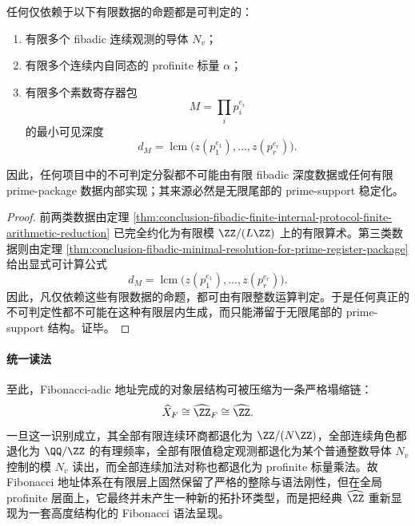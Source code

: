 \begin{corollary}\label{cor:conclusion-fibadic-undecidability-not-from-finite-depth-or-finite-package}
任何仅依赖于以下有限数据的命题都是可判定的：
\begin{enumerate}
\normalfont
  \item 有限多个 fibadic 连续观测的导体 \(N_v\)；
  \item 有限多个连续内自同态的 profinite 标量 \(\alpha\)；
  \item 有限多个素数寄存器包
  \[
  M=\prod_i p_i^{e_i}
  \]
  的最小可见深度
  \[
  d_M=\operatorname{lcm}\bigl(z(p_1^{e_1}),\dots,z(p_r^{e_r})\bigr).
  \]
\end{enumerate}
因此，任何项目中的不可判定分裂都不可能由有限 fibadic 深度数据或任何有限 prime-package 数据内部实现；其来源必然是无限尾部的 prime-support 稳定化。
\end{corollary}
\begin{proof}
前两类数据由定理 \ref{thm:conclusion-fibadic-finite-internal-protocol-finite-arithmetic-reduction} 已完全约化为有限模 \(\ZZ/(L\ZZ)\) 上的有限算术。第三类数据则由定理 \ref{thm:conclusion-fibadic-minimal-resolution-for-prime-register-package} 给出显式可计算公式
\[
d_M=\operatorname{lcm}\bigl(z(p_1^{e_1}),\dots,z(p_r^{e_r})\bigr).
\]
因此，凡仅依赖这些有限数据的命题，都可由有限整数运算判定。于是任何真正的不可判定性都不可能在这种有限层内生成，而只能滞留于无限尾部的 prime-support 结构。证毕。
\end{proof}

\paragraph{统一读法}
至此，Fibonacci-adic 地址完成的对象层结构可被压缩为一条严格塌缩链：
\[
\widehat X_F
\cong
\widehat{\ZZ}_F
\cong
\widehat{\ZZ}.
\]
一旦这一识别成立，其全部有限连续环商都退化为 \(\ZZ/(N\ZZ)\)，全部连续角色都退化为 \(\QQ/\ZZ\) 的有理频率，全部有限值稳定观测都退化为某个普通整数导体 \(N_v\) 控制的模 \(N_v\) 读出，而全部连续加法对称也都退化为 profinite 标量乘法。故 Fibonacci 地址体系在有限层上固然保留了严格的整除与语法刚性，但在全局 profinite 层面上，它最终并未产生一种新的拓扑环类型，而是把经典 \(\widehat{\ZZ}\) 重新显现为一套高度结构化的 Fibonacci 语法呈现。

\endinput
